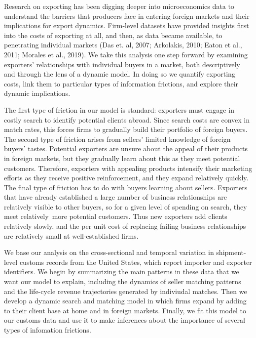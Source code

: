 \documentclass[12pt]{article}
\begin{document}
Research on exporting has been digging deeper into microeconomics data to
understand the barriers that producers face in entering foreign markets and
their implications for export dynamics. Firm-level datasets have provided
insights first into the costs of exporting at all, and then, as data became
available, to penetrating individual markets (Das et. al, 2007; Arkolakis,
2010; Eaton et al., 2011; Morales et al., 2019). We take this analysis one
step forward by examining exporters' relationships with individual buyers in
a market, both descriptively and through the lens of a dynamic model. In
doing so we quantify exporting costs, link them to particular types of
information frictions, and explore their dynamic implications.

The first type of friction in our model is standard: exporters must engage
in costly search to identify potential clients abroad. Since search costs
are convex in match rates, this forces firms to gradually build their
portfolio of foreign buyers. The second type of friction arises from
sellers' limited knowledge of foreign buyers' tastes. Potential exporters
are unsure about the appeal of their products in foreign markets, but they
gradually learn about this as they meet potential customers. Therefore,
exporters with appealing products intensify their marketing efforts as they
receive positive reinforcement, and they expand relatively quickly. The
final type of friction has to do with buyers learning about sellers.
Exporters that have already established a large number of business
relationships are relatively visible to other buyers, so for a given level
of spending on search, they meet relatively\ more potential customers. Thus
new exporters add clients relatively slowly, and the per unit cost of
replacing failing business relationships are relatively small at
well-established firms.

We base our analysis on the cross-sectional and temporal variation in
shipment-level customs records from the United States, which report importer
and exporter identifiers. We begin by summarizing the main patterns in these
data that we want our model to explain, including the dynamics of seller
matching patterns and the life-cycle revenue trajectories generated by
indiviudal matches. Then we develop a dynamic search and matching model in
which firms expand by adding to their client base at home and in foreign
markets. Finally, we fit this model to our customs data and use it to make
inferences about the importance of several types of infomation frictions.
\end{document}
